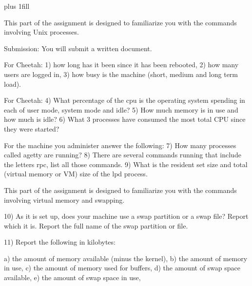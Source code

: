 
\rightskip=0pt plus 1fill

\parindent 0pt

This part of the assignment is designed to familiarize you with the
commands involving Unix processes.

Submission: You will submit a written document.

For Cheetah: 1) how long has it been since it has
been rebooted, 2) how many users are logged in, 3) how busy is the machine
(short, medium and long term load).

For Cheetah: 4) What percentage of the cpu is the operating system
spending in each of user mode, system mode and idle?
5) How much memory is in use and
how much is idle?
6) What 3 processes have consumed the most total CPU since
they were started?

For the machine you administer answer the following:
7) How many processes called {\ltt{}agetty} are running?
8) There are several commands running that include the letters {\ltt{}rpc},
list all those commands.
9) What is the resident set size and total (virtual memory or VM) size of the
lpd process.

%
%

This part of the assignment is designed to familiarize you with the
commands involving virtual memory and swapping.

10) As it is set up,
does your machine use a swap partition or a swap file? 
Report which it is.
Report the full name of the swap partition or file.

11) Report the following in kilobytes:

a) the amount of memory available (minus the kernel),
\break
b) the amount of memory in use,
\break
c) the amount of memory used for buffers,
\break
d) the amount of swap space available,
\break
e) the amount of swap space in use,

